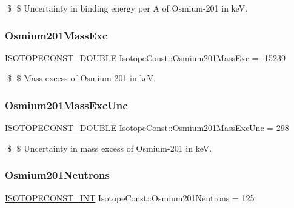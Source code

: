 \$ \$ Uncertainty in binding energy per A of Osmium-\/201 in keV. \mbox{\label{group___isotope_const-_osmium-_os201_ga1e5020eb4b1acd701e75129f6b243d9f}} 
\subsubsection{\texorpdfstring{Osmium201\+Mass\+Exc}{Osmium201MassExc}}
{\footnotesize\ttfamily \mbox{\hyperlink{group___isotope_const-_macros_ga8f45a7272ce02c0b4c65c44636ed719a}{I\+S\+O\+T\+O\+P\+E\+C\+O\+N\+S\+T\+\_\+\+D\+O\+U\+B\+LE}} Isotope\+Const\+::\+Osmium201\+Mass\+Exc = -\/15239}

\$ \$ Mass excess of Osmium-\/201 in keV. \mbox{\label{group___isotope_const-_osmium-_os201_ga5156aaca3ad3194283d23959b201ab5a}} 
\subsubsection{\texorpdfstring{Osmium201\+Mass\+Exc\+Unc}{Osmium201MassExcUnc}}
{\footnotesize\ttfamily \mbox{\hyperlink{group___isotope_const-_macros_ga8f45a7272ce02c0b4c65c44636ed719a}{I\+S\+O\+T\+O\+P\+E\+C\+O\+N\+S\+T\+\_\+\+D\+O\+U\+B\+LE}} Isotope\+Const\+::\+Osmium201\+Mass\+Exc\+Unc = 298}

\$ \$ Uncertainty in mass excess of Osmium-\/201 in keV. \mbox{\label{group___isotope_const-_osmium-_os201_ga2fc2a5a00e4037e444aab4718b69eb31}} 
\subsubsection{\texorpdfstring{Osmium201\+Neutrons}{Osmium201Neutrons}}
{\footnotesize\ttfamily \mbox{\hyperlink{group___isotope_const-_macros_ga5f18360b3e99483a35c32d789e62621c}{I\+S\+O\+T\+O\+P\+E\+C\+O\+N\+S\+T\+\_\+\+I\+NT}} Isotope\+Const\+::\+Osmium201\+Neutrons = 125}

